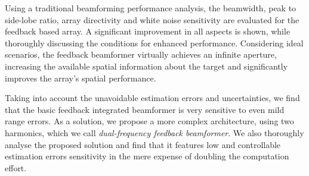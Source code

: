 \par 
Using a traditional beamforming performance analysis, the beamwidth, peak to side-lobe ratio, array directivity and white noise sensitivity are evaluated for the feedback based array.
A significant improvement in all aspects is shown, while thoroughly discussing the conditions for enhanced performance.
Considering ideal scenarios, the feedback beamformer virtually achieves an infinite aperture, increasing the available spatial information about the target and significantly improves the array's spatial performance.
\par
Taking into account the unavoidable estimation errors and uncertainties, we find that the basic feedback integrated beamformer is very sensitive to even mild range errors.
As a solution, we propose a more complex architecture, using two harmonics, which we call \emph{dual-frequency feedback beamformer}.
We also thoroughly analyse the proposed solution and find that it features low and controllable estimation errors sensitivity in the mere expense of doubling the computation effort.